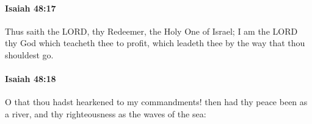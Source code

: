 		\paragraph{Isaiah 48:17} %
			\label{ISAIAH-48-17}

			Thus saith the LORD, thy Redeemer, the Holy One of Israel; I am the LORD thy God which teacheth thee to profit, which leadeth thee by the way that thou shouldest go.


		\paragraph{Isaiah 48:18} %
			\label{ISAIAH-48-18}

			O that thou hadst hearkened to my commandments! then had thy peace been as a river, and thy righteousness as the waves of the sea:


